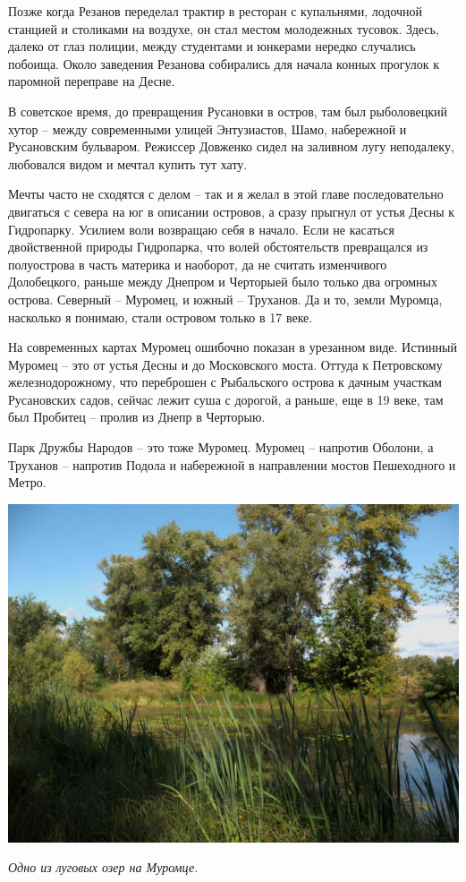 Позже когда Резанов переделал трактир в ресторан с купальнями, лодочной станцией и столиками на воздухе, он стал местом молодежных тусовок. Здесь, далеко от глаз полиции, между студентами и юнкерами нередко случались побоища. Около заведения Резанова собирались для начала конных прогулок к паромной переправе на Десне.

В советское время, до превращения Русановки в остров, там был рыболовецкий хутор – между современными улицей Энтузиастов, Шамо, набережной и Русановским бульваром. Режиссер Довженко сидел на заливном лугу неподалеку, любовался видом и мечтал купить тут хату.

Мечты часто не сходятся с делом – так и я желал в этой главе последовательно двигаться с севера на юг в описании островов, а сразу прыгнул от устья Десны к Гидропарку. Усилием воли возвращаю себя в начало. Если не касаться двойственной природы Гидропарка, что волей обстоятельств превращался из полуострова в часть материка и наоборот, да не считать изменчивого Долобецкого, раньше между Днепром и Черторыей было только два огромных острова. Северный – Муромец, и южный – Труханов. Да и то, земли Муромца, насколько я понимаю, стали островом только в 17 веке.

На современных картах Муромец ошибочно показан в урезанном виде. Истинный Муромец – это от устья Десны и до Московского моста. Оттуда к Петровскому железнодорожному, что переброшен с Рыбальского острова к дачным участкам Русановских садов, сейчас лежит суша с дорогой, а раньше, еще в 19 веке, там был Пробитец – пролив из Днепр в Черторыю.

Парк Дружбы Народов – это тоже Муромец. Муромец – напротив Оболони, а Труханов – напротив Подола и набережной в направлении  мостов Пешеходного и Метро.

\begin{center}
\includegraphics[width=\linewidth]{chast-gorodki/cherto/s_CRW_3908.jpg}

\textit{Одно из луговых озер на Муромце.}
\end{center}

